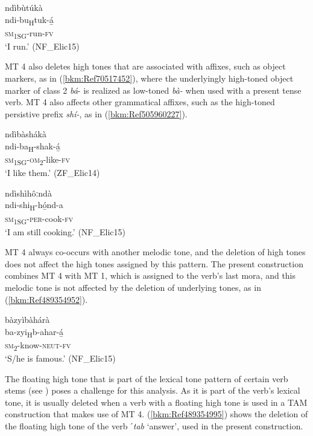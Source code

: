 \ea
\label{bkm:Ref507575156}
\glll ndìbùtúkà\\
ndi-bu\textsubscript{H}tuk-á̲\\
\textsc{sm}\textsubscript{1SG}-run-\textsc{fv}\\
\glt ‘I run.’ (NF\_Elic15)
\z

MT 4 also deletes high tones that are associated with affixes, such as object markers, as in (\ref{bkm:Ref70517452}), where the underlyingly high-toned object marker of class 2 \textit{bá}- is realized as low-toned \textit{bà-} when used with a present tense verb. MT 4 also affects other grammatical affixes, such as the high-toned persistive prefix \textit{shí-}, as in (\ref{bkm:Ref505960227}).

\ea
\label{bkm:Ref70517452}
\glll ndìbàshákà\\
ndi-ba\textsubscript{H}-shak-á̲\\
\textsc{sm}\textsubscript{1SG}-\textsc{om}\textsubscript{2}-like-\textsc{fv}\\
\glt ‘I like them.’ (ZF\_Elic14)
\z

\ea
\label{bkm:Ref505960227}
\glll ndìshìhôːndà\\
ndi-shi\textsubscript{H}-hó̲nd-a\\
\textsc{sm}\textsubscript{1SG}-\textsc{per}-cook-\textsc{fv}\\
\glt ‘I am still cooking.’ (NF\_Elic15)
\z

MT 4 always co-occurs with another melodic tone, and the deletion of high tones does not af\-fect the high tones assigned by this pattern. The present construction combines MT 4 with MT 1, which is assigned to the verb’s last mora, and this melodic tone is not affected by the deletion of underlying tones, as in (\ref{bkm:Ref489354952}).

\ea
\label{bkm:Ref489354952}
\glll bàzyìbàhárà\\
ba-zyi\textsubscript{H}b-ahar-á̲\\
\textsc{sm}\textsubscript{2}-know-\textsc{neut}-\textsc{fv}\\
\glt ‘S/he is famous.’ (NF\_Elic15)
\z

The floating high tone that is part of the lexical tone pattern of certain verb stems (see ) poses a challenge for this analysis. As it is part of the verb’s lexical tone, it is usually deleted when a verb with a floating high tone is used in a TAM construction that makes use of MT 4. (\ref{bkm:Ref489354995}) shows the deletion of the floating high tone of the verb \textit{ˊtab} ‘answer’, used in the pre\-sent construction.

